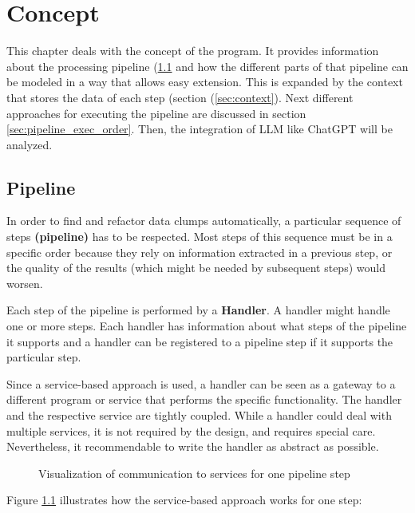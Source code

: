 \begingroup
\renewcommand{\cleardoublepage}{} %
\renewcommand{\clearpage}{}
\chapter{Concept}\label{chapter_conception}
\endgroup
This chapter deals with the concept of the program. It provides information about the processing pipeline (\ref{sec:pipeline} and how the different parts of that pipeline can be modeled in a way that allows easy extension. This is expanded by the context that stores the data of each step (section (\ref{sec:context}). Next different approaches for executing the pipeline are discussed in section \ref{sec:pipeline_exec_order}. Then, the integration of \ac{LLM} like ChatGPT will be analyzed. 


\hfill
\section{Pipeline}\label{sec:pipeline}
In order to find and refactor data clumps automatically, a particular sequence of steps \textbf{(pipeline)} has to be respected. Most steps of this sequence must be in a specific order because they rely on information extracted in a previous step, or the quality of the results (which might be needed by subsequent steps) would worsen.

Each step of the pipeline is performed by a  \textbf{Handler}. A handler might handle one or more steps.  Each handler has information about what steps of the pipeline it supports and  a handler can be registered to a pipeline step if it supports the particular step.  

Since a service-based approach is used, a handler can be seen as a gateway to a different program or service that performs the specific functionality.  The handler and the respective service are tightly coupled. While a handler could deal with multiple services, it is not required by the design, and requires special care. Nevertheless, it recommendable to write the handler as abstract as possible.
\begin{figure}
    \centering
    
    \caption{Visualization of communication to services for one pipeline step}
    \label{fig:solver_gateway_service_overview}
\end{figure}

Figure \ref{fig:solver_gateway_service_overview} illustrates how the service-based approach works for one step:

